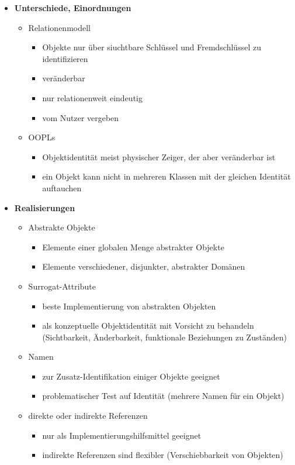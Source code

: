 \begin{itemize}
	\item \textbf{Unterschiede, Einordnungen}
	\begin{itemize}
		\item Relationenmodell
		\begin{itemize}
			\item Objekte nur über siuchtbare Schlüssel und Fremdschlüssel zu identifizieren
			\item veränderbar
			\item nur relationenweit eindeutig
			\item vom Nutzer vergeben
		\end{itemize}
		\item OOPLs
		\begin{itemize}
			\item Objektidentität meist physischer Zeiger, der aber veränderbar ist
			\item ein Objekt kann nicht in mehreren Klassen mit der gleichen Identität auftauchen
		\end{itemize}
	\end{itemize}
	
	\item \textbf{Realisierungen}
	\begin{itemize}
		\item Abstrakte Objekte
		\begin{itemize}
			\item Elemente einer globalen Menge abstrakter Objekte
			\item Elemente verschiedener, disjunkter, abstrakter Domänen
		\end{itemize}
		
		\item Surrogat-Attribute
		\begin{itemize}
			\item beste Implementierung von abstrakten Objekten
			\item als konzeptuelle Objektidentität mit Vorsicht zu behandeln (Sichtbarkeit, Änderbarkeit, funktionale Beziehungen zu Zuständen)
		\end{itemize}
		
		\item Namen
		\begin{itemize}
			\item zur Zusatz-Identifikation einiger Objekte geeignet
			\item problematischer Test auf Identität (mehrere Namen für ein Objekt)
		\end{itemize}
		
		\item direkte oder indirekte Referenzen
		\begin{itemize}
			\item nur als Implementierungshilfsmittel geeignet
			\item indirekte Referenzen sind flexibler (Verschiebbarkeit von Objekten)
		\end{itemize}
	\end{itemize}
\end{itemize}

